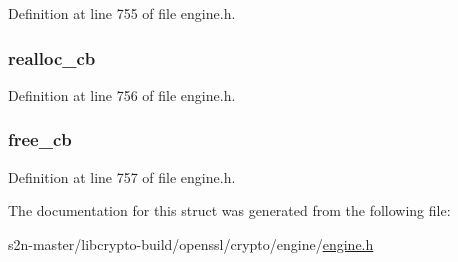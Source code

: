 Definition at line 755 of file engine.\+h.

\subsubsection[{\texorpdfstring{realloc\+\_\+cb}{realloc_cb}}]{ realloc\+\_\+cb}\hypertarget{structst__dynamic___m_e_m__fns_ab4e48a8bbffa4ee179e46cbeefe9abfb}{}\label{structst__dynamic___m_e_m__fns_ab4e48a8bbffa4ee179e46cbeefe9abfb}


Definition at line 756 of file engine.\+h.

\subsubsection[{\texorpdfstring{free\+\_\+cb}{free_cb}}]{ free\+\_\+cb}\hypertarget{structst__dynamic___m_e_m__fns_affa5cf1a1521abe935e40029b01fd5b1}{}\label{structst__dynamic___m_e_m__fns_affa5cf1a1521abe935e40029b01fd5b1}


Definition at line 757 of file engine.\+h.



The documentation for this struct was generated from the following file\+:\begin{DoxyCompactItemize}
\item 
s2n-\/master/libcrypto-\/build/openssl/crypto/engine/\hyperlink{crypto_2engine_2engine_8h}{engine.\+h}\end{DoxyCompactItemize}
